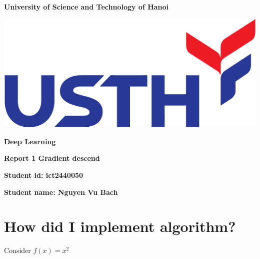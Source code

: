 \documentclass[12pt]{article}
\begin{document}
\thispagestyle{empty} %
\begin{center}
    \vspace{7pt}
    \fontsize{18pt}{17pt}\selectfont 
    \textbf{University of Science and Technology of Hanoi}
    \vspace{7pt}
\end{center}
\vspace{10pt}
\begin{center}
    \includegraphics[scale=0.4]{images/USTH.png}
\end{center}

\vspace{90pt}

\begin{center}
    \fontsize{30pt}{17pt}\selectfont 
    \textbf{Deep Learning} 
    \vspace{50pt}

    \fontsize{20pt}{17pt}\selectfont 
    \textbf{Report 1 Gradient descend}
    \vspace{50pt}


    \fontsize{17pt}{17pt}\selectfont
    \textbf{{Student id: }{ict2440050}}
    \vspace{15pt}

    \fontsize{17pt}{17pt}\selectfont
    \textbf{{Student name: }{Nguyen Vu Bach}}
    \vspace{15pt}
    
\end{center}

\newpage
\setcounter{page}{1} %

\section{How did I implement algorithm?}

Consider \(f(x)=x^2\)
\end{document}
